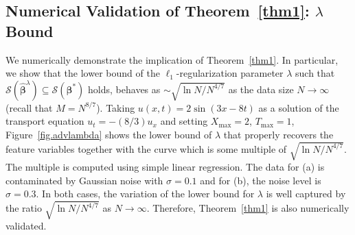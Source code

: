 \documentclass[a4paper,11pt]{article}
\newcommand{\bbeta}{\bm{\beta}}
\begin{document}
\subsection{Numerical Validation of Theorem~\ref{thm1}: $\lambda$ Bound}
We numerically demonstrate the implication of Theorem~\ref{thm1}. In particular, we show that the lower bound of the $\ell_1$-regularization parameter $\lambda$ such that $\mathcal{S}(\widehat{\bbeta}^\lambda)\subseteq\mathcal{S}(\bbeta^*)$ holds, behaves as $\sim\sqrt{\ln N/N^{4/7}}$ as the data size $N\to \infty$ (recall that $M=N^{8/7}$). Taking $u(x,t)=2\sin(3x-8t)$ as a solution of the transport equation $u_t=-(8/3)u_x$ and setting $X_{\max}=2$, $T_{\max}=1$,  Figure~\ref{fig.advlambda} shows the lower bound of $\lambda$ that properly recovers the feature variables together with the curve which is some multiple of $\sqrt{\ln N/N^{4/7}}$. The multiple is computed using simple linear regression. The data for (a) is contaminated by Gaussian noise with $\sigma=0.1$ and for (b), the noise level is $\sigma=0.3$. In both cases, the variation of the lower bound for $\lambda$ is well captured by the ratio $\sqrt{\ln N/N^{4/7}}$ as $N\to\infty$. Therefore, Theorem~\ref{thm1} is also numerically validated.
\end{document}
